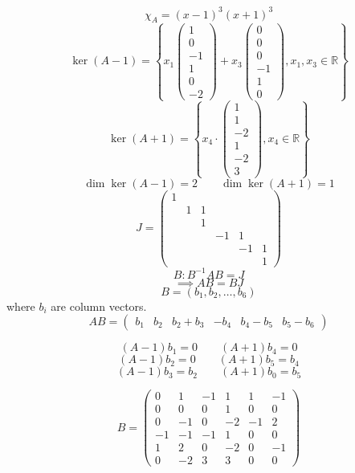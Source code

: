 \documentclass[a4paper]{article}
\theoremstyle{definition}
\newcommand\set[1]{\left\{#1\right\}}
\begin{document}
\[ \chi_A = (x - 1)^3 (x + 1)^3 \]
\[ \ker(A - 1) = \set{x_1 \begin{pmatrix} 1 \\ 0 \\ -1 \\ 1 \\ 0 \\ -2 \end{pmatrix} + x_3 \begin{pmatrix} 0 \\ 0 \\ 0 \\-1 \\ 1 \\ 0 \end{pmatrix}, x_1, x_3 \in \mathbb R} \]
\[ \ker(A + 1) = \set{x_4 \cdot \begin{pmatrix} 1 \\ 1 \\ -2 \\ 1 \\ -2 \\ 3 \end{pmatrix}, x_4 \in \mathbb R} \]
\[ \dim\ker(A - 1) = 2 \qquad \dim\ker(A + 1) = 1 \]
\[
  J = \begin{pmatrix}
    1 &   &   &    &    & \\
      & 1 & 1 &    &    & \\
      &   & 1 &    &    & \\
      &   &   & -1 & 1  & \\
      &   &   &    & -1 & 1 \\
      &   &   &    &    & 1
  \end{pmatrix}
\] \[
  B: B^{-1} AB = J
\] \[ \implies AB = BJ \]
\[ B = (b_1, b_2, \dots, b_6) \]
where $b_i$ are column vectors.
\[ AB = \begin{pmatrix} b_1 & b_2 & b_2+b_3 & -b_4 & b_4-b_5 & b_5-b_6 \end{pmatrix}  \]

\[ (A - 1) b_1 = 0 \qquad (A + 1) b_4 = 0 \]
\[ (A - 1) b_2 = 0 \qquad (A + 1) b_5 = b_4 \]
\[ (A - 1) b_3 = b_2 \qquad (A + 1) b_0 = b_5 \]

\[
  B = \begin{pmatrix}
    0 & 1 & -1 & 1 & 1 & -1 \\
    0 & 0 & 0 & 1 & 0 & 0 \\
    0 & -1 & 0 & -2 & -1 & 2 \\
    -1 & -1 & -1 & 1 & 0 & 0 \\
    1 & 2 & 0 & -2 & 0 & -1 \\
    0 & -2 & 3 & 3& 0 & 0
  \end{pmatrix}
\]
\end{document}
